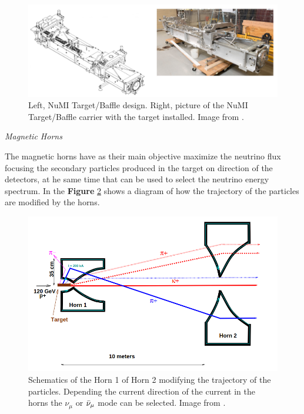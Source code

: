  \begin{figure}[!htb]
\centering
\includegraphics[scale=0.33]{Figures/Chapter2/TargetCarrier.png}
        \caption{Left, NuMI Target/Baffle design. Right, picture of the NuMI Target/Baffle carrier with the target installed. Image from \cite{NuMITarget}.} 
\label{fig:MnvExp:NuMI:NuMITargetCarrier}
\end{figure}

\textit{Magnetic Horns}

The magnetic horns have as their main objective maximize the neutrino flux focusing the secondary particles produced in the target on direction of the detectors, at he same time that can be used to select the neutrino energy spectrum. In the \textbf{Figure} \ref{fig:MnvExp:NuMI:HornsFocusSystem} shows a diagram of how the trajectory of the particles are modified by the horns. 

\begin{figure}[!htb]
\centering
\includegraphics[scale=0.33]{Figures/Chapter2/HornsFocusSystem.png}
        \caption{Schematics of the Horn 1 of Horn 2 modifying the trajectory of the particles. Depending the current direction of the current in the horns the $\nu_\mu$ or $\Bar{\nu}_\mu$ mode can be selected. Image from \cite{Numi}.} 
\label{fig:MnvExp:NuMI:HornsFocusSystem}
\end{figure}

